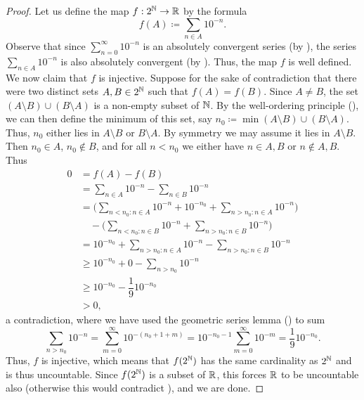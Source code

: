 \begin{proof}
  Let us define the map \(f : 2^{\mathbb{N}} \to \mathbb{R}\) by the formula
  \[
    f(A) \coloneqq \sum_{n \in A} 10^{-n}.
  \]
  Observe that since \(\sum_{n = 0}^\infty 10^{-n}\) is an absolutely convergent series (by ), the series \(\sum_{n \in A} 10^{-n}\) is also absolutely convergent (by ).
  Thus, the map \(f\)  is well defined.
  We now claim that \(f\) is injective.
  Suppose for the sake of contradiction that there were two distinct sets \(A, B \in 2^{\mathbb{N}}\) such that \(f(A) = f(B)\).
  Since \(A \neq B\), the set \((A \setminus B) \cup (B \setminus A)\) is a non-empty subset of \(\mathbb{N}\).
  By the well-ordering principle (), we can then define the minimum of this set, say \(n_0 \coloneqq \min(A \setminus B) \cup (B \setminus A)\).
  Thus, \(n_0\) either lies in \(A \setminus B\) or \(B \setminus A\).
  By symmetry we may assume it lies in \(A \setminus B\).
  Then \(n_0 \in A\), \(n_0 \notin B\), and for all \(n < n_0\) we either have \(n \in A, B\) or \(n \notin A, B\).
  Thus
  \begin{align*}
    0 & = f(A) - f(B)                                                                                 \\
      & = \sum_{n \in A} 10^{-n} - \sum_{n \in B} 10^{-n}                                             \\
      & = \Bigg(\sum_{n < n_0 : n \in A} 10^{-n} + 10^{-n_0} + \sum_{n > n_0 : n \in A} 10^{-n}\Bigg) \\
      & \quad - \Bigg(\sum_{n < n_0 : n \in B} 10^{-n} + \sum_{n > n_0 : n \in B} 10^{-n}\Bigg)       \\
      & = 10^{-n_0} + \sum_{n > n_0 : n \in A} 10^{-n} - \sum_{n > n_0 : n \in B} 10^{-n}             \\
      & \geq 10^{-n_0} + 0 - \sum_{n > n_0} 10^{-n}                                                   \\
      & \geq 10^{-n_0} - \dfrac{1}{9} 10^{-n_0}                                                       \\
      & > 0,
  \end{align*}
  a contradiction, where we have used the geometric series lemma () to sum
  \[
    \sum_{n > n_0} 10^{-n} = \sum_{m = 0}^\infty 10^{-(n_0 + 1 + m)} = 10^{-n_0 - 1} \sum_{m = 0}^\infty 10^{-m} = \dfrac{1}{9} 10^{-n_0}.
  \]
  Thus, \(f\) is injective, which means that \(f(2^{\mathbb{N}})\) has the same cardinality as \(2^{\mathbb{N}}\) and is thus uncountable.
  Since \(f(2^{\mathbb{N}})\) is a subset of \(\mathbb{R}\), this forces \(\mathbb{R}\) to be uncountable also (otherwise this would contradict ), and we are done.
\end{proof}

